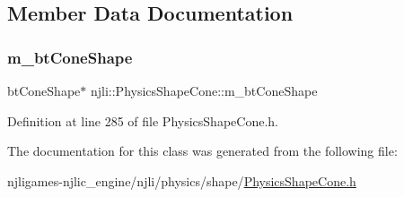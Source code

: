 \subsection{Member Data Documentation}
\mbox{\label{classnjli_1_1_physics_shape_cone_a650023829d4961897114be23b7123c56}} 
\subsubsection{\texorpdfstring{m\+\_\+bt\+Cone\+Shape}{m\_btConeShape}}
{\footnotesize\ttfamily bt\+Cone\+Shape$\ast$ njli\+::\+Physics\+Shape\+Cone\+::m\+\_\+bt\+Cone\+Shape\hspace{0.3cm}{\ttfamily [private]}}



Definition at line 285 of file Physics\+Shape\+Cone.\+h.



The documentation for this class was generated from the following file\+:\begin{DoxyCompactItemize}
\item 
njligames-\/njlic\+\_\+engine/njli/physics/shape/\mbox{\hyperlink{_physics_shape_cone_8h}{Physics\+Shape\+Cone.\+h}}\end{DoxyCompactItemize}
